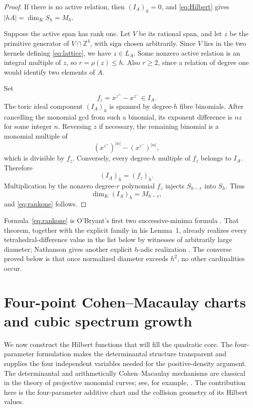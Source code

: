 \documentclass[11pt,reqno]{amsart}
\theoremstyle{definition}
\theoremstyle{remark}
\newcommand{\Z}{\mathbb Z}
\begin{document}
\begin{proof}
If there is no active relation, then $(I_A)_h=0$, and \eqref{eq:Hilbert}
gives $|hA|=\dim_K S_h=M_h$.

Suppose the active span has rank one.  Let $V$ be its rational span, and
let $z$ be the primitive generator of $V\cap\Z^4$, with sign chosen
arbitrarily.  Since $V$ lies in the two kernels defining \eqref{eq:lattice},
we have $z\in L_A$.  Some nonzero active relation is an integral multiple
of $z$, so $r=\rho(z)\leq h$.  Also $r\geq2$, since a relation of degree
one would identify two elements of $A$.

Set
\[
 f_z=x^{z^+}-x^{z^-}\in I_A.
\]
The toric ideal component $(I_A)_h$ is spanned by degree-$h$ fibre
binomials.  After cancelling the monomial gcd from such a binomial, its
exponent difference is $nz$ for some integer $n$.  Reversing $z$ if
necessary, the remaining binomial is a monomial multiple of
\[
 (x^{z^+})^{|n|}-(x^{z^-})^{|n|},
\]
which is divisible by $f_z$.  Conversely, every degree-$h$ multiple of
$f_z$ belongs to $I_A$.  Therefore
\begin{equation}\label{eq:principalpiece}
 (I_A)_h=(f_z)_h.
\end{equation}
Multiplication by the nonzero degree-$r$ polynomial $f_z$ injects
$S_{h-r}$ into $S_h$.  Thus
\[
 \dim_K(I_A)_h=M_{h-r},
\]
and \eqref{eq:rankone} follows.
\end{proof}

Formula~\eqref{eq:rankone} is O'Bryant's first two successive-minima formula
\cite[Theorem~2]{OBryant2025}.  That theorem, together with the explicit
family in his Lemma~1, already realizes every tetrahedral-difference value in
the list below by witnesses of arbitrarily large diameter; Nathanson gives
another explicit $h$-adic realization
\cite{NathansonTriangular,NathansonTetrahedral}.  The converse proved below is
that once normalized diameter exceeds $h^2$, no other
cardinalities occur.

\section{Four-point Cohen--Macaulay charts and cubic spectrum growth}
\label{sec:family}

We now construct the Hilbert functions that will fill the quadratic core.
The four-parameter formulation makes the determinantal structure
transparent and supplies the four independent variables needed for the
positive-density argument.
The determinantal and arithmetically Cohen--Macaulay mechanisms are classical
in the theory of projective monomial curves; see, for example,
\cite{BresinskyRenschuch1980,LiPatilRoberts2012,Morales1987,
MoralesSimis1993,PatilRoberts2003}.  The contribution here is the
four-parameter additive chart and the collision geometry of its Hilbert
values.
\end{document}
